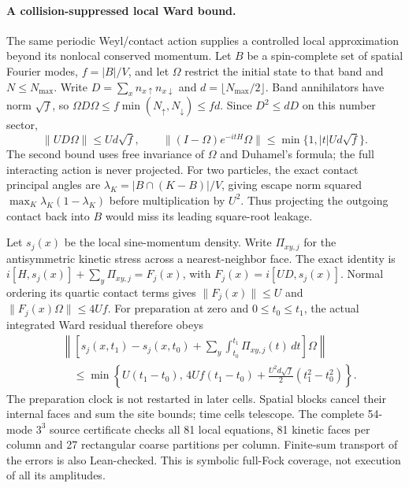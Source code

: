 \paragraph{A collision-suppressed local Ward bound.}
The same periodic Weyl/contact action supplies a controlled local
approximation beyond its nonlocal conserved momentum.  Let $B$ be a
spin-complete set of spatial Fourier modes, $f=|B|/V$, and let $\Omega$
restrict the initial state to that band and $N\leq N_{\max}$.
Write $D=\sum_xn_{x\uparrow}n_{x\downarrow}$ and
$d=\lfloor N_{\max}/2\rfloor$.  Band annihilators have norm $\sqrt f$,
so $\Omega D\Omega\leq f\min(N_\uparrow,N_\downarrow)\leq fd$.
Since $D^2\leq dD$ on this number sector,
\[
 \|UD\Omega\|\leq Ud\sqrt f,\qquad
 \|(I-\Omega)e^{-itH}\Omega\|
      \leq\min\{1,|t|Ud\sqrt f\}.
\]
The second bound uses free invariance of $\Omega$ and Duhamel's formula;
the full interacting action is never projected.  For two particles,
the exact contact principal angles are
$\lambda_K=|B\cap(K-B)|/V$, giving escape norm squared
$\max_K\lambda_K(1-\lambda_K)$ before multiplication by $U^2$.
Thus projecting the outgoing contact back into $B$ would miss its
leading square-root leakage.

Let $s_j(x)$ be the local sine-momentum density.  Write $\Pi_{xy,j}$
for the antisymmetric kinetic stress across a nearest-neighbor face.
The exact identity is
$i[H,s_j(x)]+\sum_y\Pi_{xy,j}=F_j(x)$, with
$F_j(x)=i[UD,s_j(x)]$.  Normal ordering its quartic contact terms gives
$\|F_j(x)\|\leq U$ and $\|F_j(x)\Omega\|\leq4Uf$.
For preparation at zero and $0\leq t_0\leq t_1$, the actual integrated
Ward residual therefore obeys
\[
 \begin{aligned}
 &\left\|\left[s_j(x,t_1)-s_j(x,t_0)+
       \sum_y\int_{t_0}^{t_1}\Pi_{xy,j}(t)\,dt\right]\Omega\right\|
 \\
 &\quad\leq\min\!\left\{U(t_1-t_0),\,
 4Uf(t_1-t_0)+\frac{U^2d\sqrt f}{2}(t_1^2-t_0^2)\right\}.
 \end{aligned}
\]
The preparation clock is not restarted in later cells.  Spatial blocks
cancel their internal faces and sum the site bounds; time cells telescope.
The complete 54-mode $3^3$ source certificate checks all 81 local
equations, 81 kinetic faces per column and 27 rectangular coarse
partitions per column.  Finite-sum transport of the errors is also
Lean-checked.  This is symbolic full-Fock coverage, not execution of all
its amplitudes.

